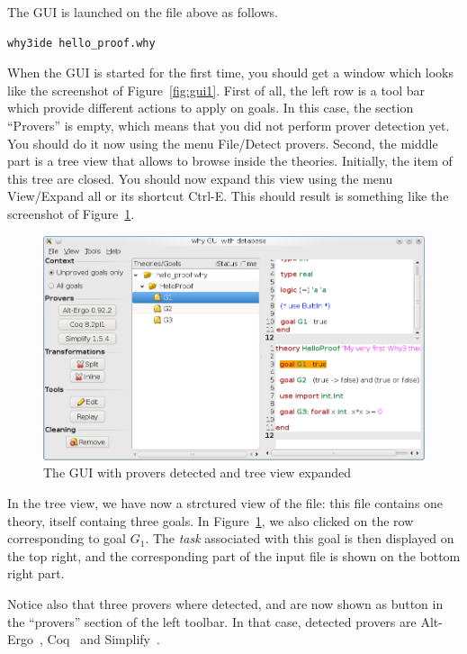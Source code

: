 The GUI is launched on the file above as follows.
\begin{verbatim}
why3ide hello_proof.why
\end{verbatim}
When the GUI is started for the first time, you should get a window
which looks like the screenshot of Figure~\ref{fig:gui1}. First of
all, the left row is a tool bar which provide different actions to
apply on goals. In this case, the section ``Provers'' is empty, which
means that you did not perform prover detection yet. You should do it
now using the menu \textsf{File/Detect provers}. Second, the middle
part is a tree view that allows to browse inside the
theories. Initially, the item of this tree are closed. You should now
expand this view using the menu \textsf{View/Expand all} or its
shortcut \textsf{Ctrl-E}. This should result is something like the
screenshot of Figure~\ref{fig:gui2}.

\begin{figure}[tbp]
  \includegraphics[width=\textwidth]{gui2.png}
  \caption{The GUI with provers detected and tree view expanded}
  \label{fig:gui2}
\end{figure}

In the tree view, we have now a strctured view of the file: this file
contains one theory, itself containg three goals. In
Figure~\ref{fig:gui2}, we also clicked on the row corresponding to
goal $G_1$. The \emph{task} associated with this goal is then
displayed on the top right, and the corresponding part of the input
file is shown on the bottom right part.

Notice also that three provers where detected, and are now shown as
button in the ``provers'' section of the left toolbar. In that case,
detected provers are Alt-Ergo~\cite{ergo}, Coq~\cite{CoqArt} and
Simplify~\cite{simplify05}. 

